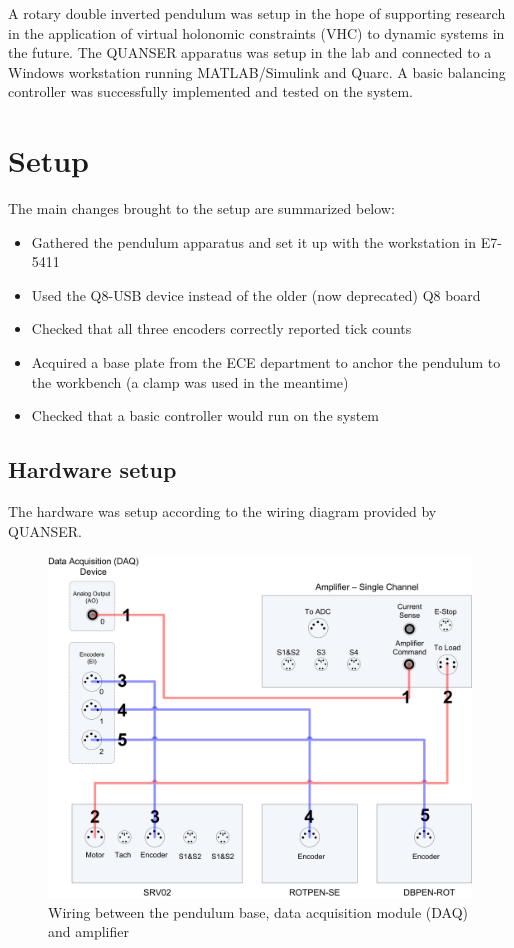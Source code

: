 \documentclass[12pt,letterpaper]{article}
\begin{document}
A rotary double inverted pendulum was setup in the hope of supporting research in the application of virtual holonomic constraints (VHC) to dynamic systems in the future. The QUANSER apparatus was setup in the lab and connected to a Windows workstation running MATLAB/Simulink and Quarc. A basic balancing controller was successfully implemented and tested on the system.

\section{Setup}

The main changes brought to the setup are summarized below:

\begin{itemize}
    \item Gathered the pendulum apparatus and set it up with the workstation in E7-5411
    \item Used the Q8-USB device instead of the older (now deprecated) Q8 board
    \item Checked that all three encoders correctly reported tick counts
    \item Acquired a base plate from the ECE department to anchor the pendulum to the workbench (a clamp was used in the meantime)
    \item Checked that a basic controller would run on the system
\end{itemize}


\subsection{Hardware setup}

The hardware was setup according to the wiring diagram provided by QUANSER.

\begin{figure}[H]
\centering
\includegraphics[width=0.7\linewidth]{img/wiring.png}
\caption[Simulation results]{Wiring between the pendulum base, data acquisition module (DAQ) and amplifier}
\label{fig:wiring}
\end{figure}
\end{document}
